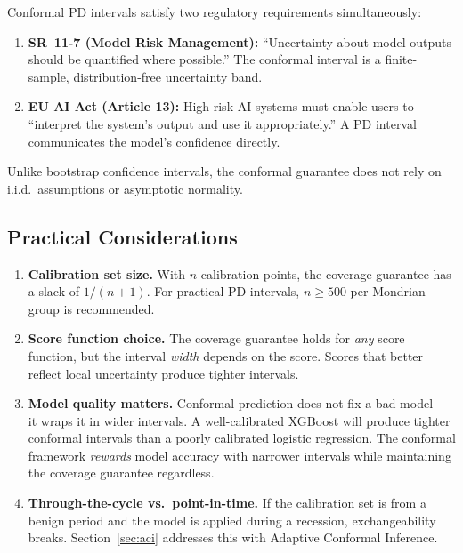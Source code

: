 \documentclass[11pt, a4paper]{article}
\theoremstyle{definition}
\theoremstyle{plain}
\theoremstyle{remark}
\begin{document}
\begin{keyresult}
Conformal PD intervals satisfy two regulatory requirements simultaneously:
\begin{enumerate}
    \item \textbf{SR~11-7 (Model Risk Management):} ``Uncertainty about model
          outputs should be quantified where possible.''  The conformal interval
          is a finite-sample, distribution-free uncertainty band.
    \item \textbf{EU AI Act (Article 13):} High-risk AI systems must enable
          users to ``interpret the system's output and use it appropriately.''
          A PD interval communicates the model's confidence directly.
\end{enumerate}
Unlike bootstrap confidence intervals, the conformal guarantee does not rely
on i.i.d.\ assumptions or asymptotic normality.
\end{keyresult}

\subsection{Practical Considerations}

\begin{enumerate}
    \item \textbf{Calibration set size.}
          With $n$ calibration points, the coverage guarantee has a slack of
          $1/(n+1)$.
          For practical PD intervals, $n \geq 500$ per Mondrian group is
          recommended.

    \item \textbf{Score function choice.}
          The coverage guarantee holds for \emph{any} score function, but the
          interval \emph{width} depends on the score.
          Scores that better reflect local uncertainty produce tighter intervals.

    \item \textbf{Model quality matters.}
          Conformal prediction does not fix a bad model --- it wraps it in wider
          intervals.
          A well-calibrated XGBoost will produce tighter conformal intervals than
          a poorly calibrated logistic regression.
          The conformal framework \emph{rewards} model accuracy with narrower
          intervals while maintaining the coverage guarantee regardless.

    \item \textbf{Through-the-cycle vs.\ point-in-time.}
          If the calibration set is from a benign period and the model is applied
          during a recession, exchangeability breaks.
          Section~\ref{sec:aci} addresses this with Adaptive Conformal Inference.
\end{enumerate}
\end{document}
